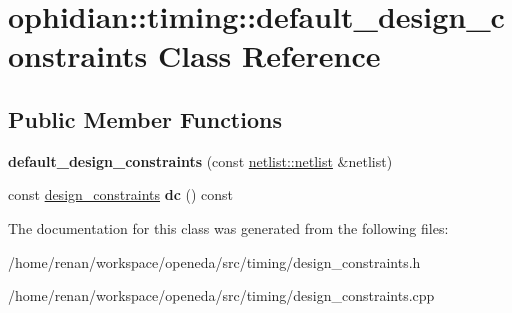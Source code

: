 \hypertarget{classophidian_1_1timing_1_1default__design__constraints}{\section{ophidian\-:\-:timing\-:\-:default\-\_\-design\-\_\-constraints Class Reference}
\label{classophidian_1_1timing_1_1default__design__constraints}
}
\subsection*{Public Member Functions}
\begin{DoxyCompactItemize}
\item 
\hypertarget{classophidian_1_1timing_1_1default__design__constraints_a5d06c49860baa2beb57d1af9a4b26aa1}{{\bfseries default\-\_\-design\-\_\-constraints} (const \hyperlink{classophidian_1_1netlist_1_1netlist}{netlist\-::netlist} \&netlist)}\label{classophidian_1_1timing_1_1default__design__constraints_a5d06c49860baa2beb57d1af9a4b26aa1}

\item 
\hypertarget{classophidian_1_1timing_1_1default__design__constraints_af994b8ed73752324b74f26a86985fdc9}{const \hyperlink{structophidian_1_1timing_1_1design__constraints}{design\-\_\-constraints} {\bfseries dc} () const }\label{classophidian_1_1timing_1_1default__design__constraints_af994b8ed73752324b74f26a86985fdc9}

\end{DoxyCompactItemize}


The documentation for this class was generated from the following files\-:\begin{DoxyCompactItemize}
\item 
/home/renan/workspace/openeda/src/timing/design\-\_\-constraints.\-h\item 
/home/renan/workspace/openeda/src/timing/design\-\_\-constraints.\-cpp\end{DoxyCompactItemize}
